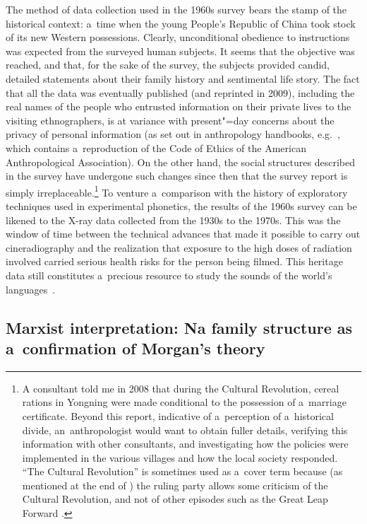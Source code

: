 \largerpage[-2] 
The method of data collection used in the 1960s survey bears the stamp of the historical context: a~time when the young
People’s Republic of China took stock of its new Western possessions. Clearly, unconditional
obedience to instructions was expected from the surveyed human subjects. It seems that the objective
was reached, and that, for the sake of the survey, the subjects provided candid,
detailed statements about their family history and sentimental life story. The fact that all the
data was eventually published (and reprinted in 2009), including the real names of the people who
entrusted information on their private lives to the visiting ethnographers, is at variance with
present"=day concerns about the privacy of personal information (as set out in anthropology
handbooks, e.g.~\citealt{fluehrlobban2014}, which contains a~reproduction of the Code of Ethics of the
American Anthropological Association). On the other hand, the social structures described in the
survey have undergone such changes since then that the survey report is simply
irreplaceable.\footnote{A consultant told me in 2008 that during the Cultural Revolution, cereal
	rations in Yongning were made conditional to the possession of a~marriage certificate. Beyond this
	report, indicative of a~perception of a~historical divide, an~anthropologist would want to obtain
	fuller details, verifying this information with other consultants, and investigating how the policies
	were implemented in the various villages and how the local society responded. “The Cultural
	Revolution” is sometimes used as a~cover term because (as mentioned at the end of ) the ruling party allows some criticism of the Cultural Revolution, and not of other episodes such as the Great Leap Forward \citep[172]{mazard2011}.} To venture a~comparison with the history of exploratory techniques used in experimental phonetics, the results of the 1960s survey can be likened to the X-ray data collected from the 1930s to the 1970s. This was the window of time between the technical advances that made it possible to carry out cineradiography and the realization that exposure to the high doses of radiation involved carried serious health risks for the person being filmed. This heritage data still constitutes a~precious resource to study the sounds of the world’s languages~\citep{fant1960,leroyetal1974,bothoreletal1986,bouarourouetal2008}.


\subsection[Marxist interpretation of the Na family structure]{Marxist interpretation: Na family structure as a~confirmation of Morgan’s theory}
\label{sec:marxistinterpretationnafamilystructureasaconfirmationofmorganstheory}
\largerpage[-2] 

